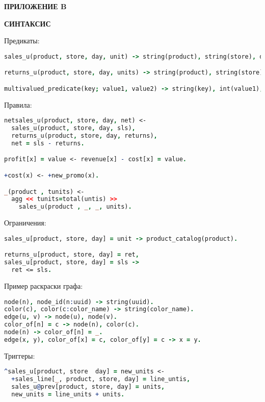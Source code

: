 \newpage
\begin{flushright}
\textbf{\MakeUppercase{Приложение B}}
\end{flushright}
\begin{center}
\textbf{\MakeUppercase{\logiql синтаксис}}
\end{center}

Предикаты:

\begin{lstlisting}[language=Prolog]
sales_u(product, store, day, unit) -> string(product), string(store), datetime(day), int(unit).

returns_u(product, store, day, units) -> string(product), string(store), datetime(day), int(units).

multivalued_predicate(key; value1, value2) -> string(key), int(value1), int(value2).
\end{lstlisting}

Правила:

\begin{lstlisting}[language=Prolog]
netsales_u(product, store, day, net) <-
  sales_u(product, store, day, sls),
  returns_u(product, store, day, returns),
  net = sls - returns.

profit[x] = value <- revenue[x] - cost[x] = value.

+cost(x) <- +new_promo(x).

_(product , tunits) <-
  agg << tunits=total(untis) >>
    sales_u(product , _, _, units).


\end{lstlisting}

Ограничения:

\begin{lstlisting}[language=Prolog]
sales_u[product, store, day] = unit -> product_catalog(product).

returns_u[product, store, day] = ret,
sales_u[product, store, day] = sls ->
  ret <= sls.
\end{lstlisting}

Пример раскраски графа:

\begin{lstlisting}[language=Prolog]
node(n), node_id(n:uuid) -> string(uuid).
color(c), color(c:color_name) -> string(color_name).
edge(u, v) -> node(u), node(v).
color_of[n] = c -> node(n), color(c).
node(n) -> color_of[n] = _.
edge(x, y), color_of[x] = c, color_of[y] = c -> x = y.
\end{lstlisting}

Триггеры:

\begin{lstlisting}[language=Prolog]
^sales_u[product, store  day] = new_units <-
  +sales_line[_, product, store, day] = line_untis,
  sales_u@prev[product, store, day] = units,
  new_units = line_units + units.
\end{lstlisting}
